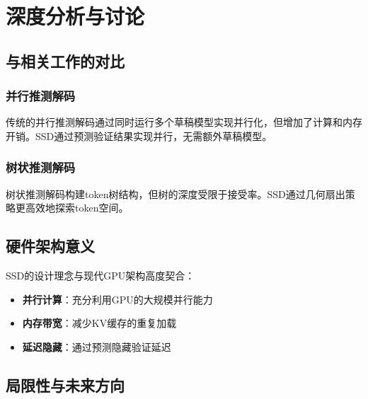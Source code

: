 \documentclass[11pt,a4paper]{article}
\newcommand{\hlblue}[1]{\textcolor{primaryblue}{\textbf{#1}}}
\newcommand{\hlpurple}[1]{\textcolor{primarypurple}{\textbf{#1}}}
\newcommand{\hlteal}[1]{\textcolor{primaryteal}{\textbf{#1}}}
\begin{document}
\newpage

\section{深度分析与讨论}

\subsection{与相关工作的对比}

\subsubsection{并行推测解码}

\begin{conceptbox}[对比]
  传统的并行推测解码通过同时运行多个草稿模型实现并行化，但增加了计算和内存开销。SSD通过预测验证结果实现并行，无需额外草稿模型。
\end{conceptbox}

\subsubsection{树状推测解码}

\begin{conceptbox}[对比]
  树状推测解码构建token树结构，但树的深度受限于接受率。SSD通过几何扇出策略更高效地探索token空间。
\end{conceptbox}

\subsection{硬件架构意义}

SSD的设计理念与现代GPU架构高度契合：

\begin{itemize}
  \item \hlblue{并行计算}：充分利用GPU的大规模并行能力
  \item \hlpurple{内存带宽}：减少KV缓存的重复加载
  \item \hlteal{延迟隐藏}：通过预测隐藏验证延迟
\end{itemize}

\subsection{局限性与未来方向}
\end{document}
